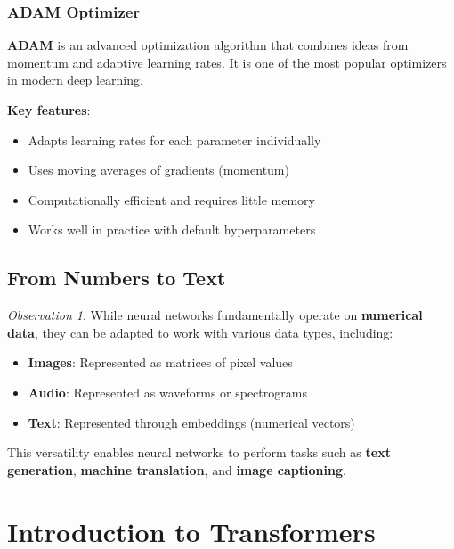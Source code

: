\documentclass[11pt,a4paper]{article}
\theoremstyle{definition}
\theoremstyle{plain}
\theoremstyle{remark}
\newtheorem*{observation}{Observation}
\begin{document}
\subsubsection{ADAM Optimizer}

\begin{tcolorbox}[colback=purple!5!white,colframe=purple!75!black,title=\textbf{ADAM (Adaptive Moment Estimation)}]
\textbf{ADAM} is an advanced optimization algorithm that combines ideas from momentum and adaptive learning rates. It is one of the most popular optimizers in modern deep learning.

\textbf{Key features}:
\begin{itemize}
    \item Adapts learning rates for each parameter individually
    \item Uses moving averages of gradients (momentum)
    \item Computationally efficient and requires little memory
    \item Works well in practice with default hyperparameters
\end{itemize}
\end{tcolorbox}

\subsection{From Numbers to Text}

\begin{observation}
While neural networks fundamentally operate on \textbf{numerical data}, they can be adapted to work with various data types, including:
\begin{itemize}
    \item \textbf{Images}: Represented as matrices of pixel values
    \item \textbf{Audio}: Represented as waveforms or spectrograms
    \item \textbf{Text}: Represented through embeddings (numerical vectors)
\end{itemize}

This versatility enables neural networks to perform tasks such as \textbf{text generation}, \textbf{machine translation}, and \textbf{image captioning}.
\end{observation}

\section{Introduction to Transformers}
\end{document}
